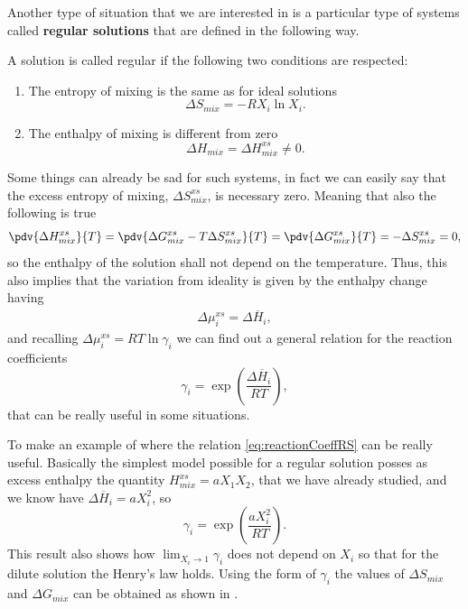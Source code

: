 Another type of situation that we are interested in is a particular type of systems called \textbf{regular solutions} that are defined in the following way.
{
    A solution is called regular if the following two conditions are respected:
    \begin{enumerate}
        \item The entropy of mixing is the same as for ideal solutions
            \begin{equation}
                \Delta S_{mix} = -RX_i \ln X_i.
            \end{equation}
        \item The enthalpy of mixing is different from zero
            \begin{equation}
                \Delta H_{mix} = \Delta H_{mix}^{xs} \neq 0.
            \end{equation}
    \end{enumerate}
}
\noindent
Some things can already be sad for such systems, in fact we can easily say that the excess entropy of mixing, $\Delta S_{mix}^{xs}$, is necessary zero. Meaning that also the following is true
\begin{equation}
    \pdv{\Delta H^{xs}_{mix}}{T} = \pdv{\Delta G_{mix}^{xs} - T\Delta S_{mix}^{xs}}{T} = \pdv{\Delta G_{mix}^{xs}}{T} = -\Delta S_{mix}^{xs} = 0,
\end{equation}
so the enthalpy of the solution shall not depend on the temperature. Thus, this also implies that the variation from ideality is given by the enthalpy change having
\begin{align}
    \Delta\mu_i^{xs} = \Delta \overline{H}_i,
\end{align}
and recalling $\Delta\mu_i^{xs} = RT\ln\gamma_i$ we can find out a general relation for the reaction coefficients
\begin{equation}
    \label{eq:reactionCoeffRS}
    \gamma_i = \exp\left( \frac{\Delta \overline{H}_i}{RT} \right),
\end{equation}
that can be really useful in some situations.

\ex{}
{
    \label{ex:SimpleEnthalpy}
    To make an example of where the relation \eqref{eq:reactionCoeffRS} can be really useful. Basically the simplest model possible for a regular solution posses as excess enthalpy the quantity $H_{mix}^{xs} = aX_1X_2$, that we have already studied, and we know have $\Delta \overline{H}_i = aX_i^2$, so
    \begin{equation}
        \gamma_i = \exp\left( \frac{ aX_i^2}{RT} \right).
    \end{equation}
    This result also shows how $\lim_{X_i\to 1} \gamma_i$ does not depend on $X_i$ so that for the dilute solution the Henry's law holds. Using the form of $\gamma_i$ the values of $\Delta S_{mix}$ and $\Delta G_{mix}$ can be obtained as shown in .
}

